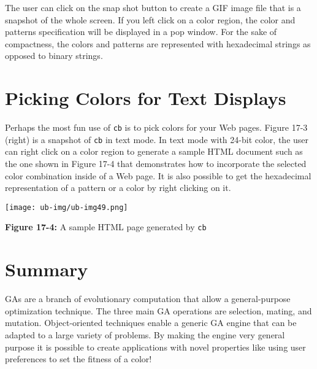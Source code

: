 The user can click on the snap shot button to create a GIF image file
that is a snapshot of the whole screen. If you left click on a color
region, the color and patterns specification will be displayed in a pop
window. For the sake of compactness, the colors and patterns are
represented with hexadecimal strings as opposed to binary strings.

\section{Picking Colors for Text Displays}

Perhaps the most fun use of \texttt{cb} is to pick colors for your Web
pages. Figure 17-3 (right) is a snapshot of \texttt{cb} in text mode.
In text mode with 24-bit color, the user can right click on a color
region to generate a sample HTML document such as the one shown in
Figure 17-4 that demonstrates how to incorporate the selected color
combination inside of a Web page. It is also possible to get the
hexadecimal representation of a pattern or a color by right clicking on
it.

\begin{center}
\texttt{[image: ub-img/ub-img49.png]}
\end{center}

{\sffamily\bfseries Figure 17-4:}
{\sffamily A sample HTML page generated by \texttt{cb}}

\section*{Summary}

GAs are a branch of evolutionary computation that allow a
general-purpose optimization technique. The three main GA operations
are selection, mating, and mutation. Object-oriented techniques enable
a generic GA engine that can be adapted to a large variety of problems.
By making the engine very general purpose it is possible to create
applications with novel properties like using user preferences to set
the fitness of a color!

